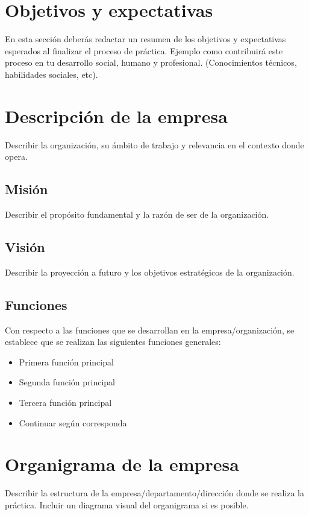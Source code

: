 \documentclass[12pt, a4paper]{article}
\begin{document}
\section{Objetivos y expectativas}
En esta sección deberás redactar un resumen de los objetivos y expectativas esperados al finalizar el proceso de práctica. Ejemplo como contribuirá este proceso en tu desarrollo social, humano y profesional. (Conocimientos técnicos, habilidades sociales, etc).

\section{Descripción de la empresa}
Describir la organización, su ámbito de trabajo y relevancia en el contexto donde opera.

\subsection{Misión}
Describir el propósito fundamental y la razón de ser de la organización.

\subsection{Visión}
Describir la proyección a futuro y los objetivos estratégicos de la organización.

\subsection{Funciones}
Con respecto a las funciones que se desarrollan en la empresa/organización, se establece que se realizan las siguientes funciones generales:

\begin{itemize}
    \item Primera función principal
    \item Segunda función principal
    \item Tercera función principal
    \item Continuar según corresponda
\end{itemize}

\section{Organigrama de la empresa}
Describir la estructura de la empresa/departamento/dirección donde se realiza la práctica. Incluir un diagrama visual del organigrama si es posible.
\end{document}
